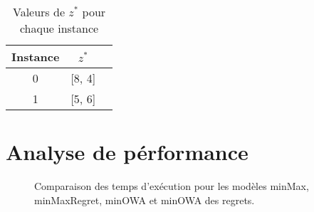 \documentclass[10pt,a4paper]{report}
\begin{document}
\begin{table}[h!]
\centering
\begin{tabular}{|c|c|c|}
\hline
Instance & \( z^* \) \\
\hline
0 & [8, 4] \\
1 & [5, 6] \\
\hline
\end{tabular}
\caption{Valeurs de \( z^* \) pour chaque instance}
\label{tab:z_star}
\end{table}
\section{Analyse de pérformance}
\begin{figure}[h!]
    \centering
      
    \caption{Comparaison des temps d'exécution pour les modèles minMax, minMaxRegret, minOWA et minOWA des regrets.}
    \label{fig:performance_ex3}
\end{figure}
\end{document}
